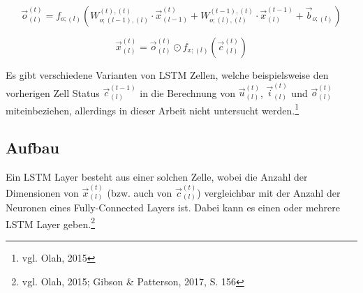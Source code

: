 \documentclass[a4paper,12pt,ngerman,oneside]{scrreprt}	%
\begin{document}
			\begin{equation}\label{oFormel}
				\vec{o}_{(l)}^{(t)} = f_{o;(l)} \left( W_{o; (l-1),(l)}^{(t),(t)} \cdot \vec{x}_{(l-1)}^{(t)} + W_{o; (l),(l)}^{(t-1),(t)} \cdot \vec{x}_{(l)}^{(t-1)} + \vec{b}_{o; (l)} \right)
			\end{equation}
			
			\begin{equation}\label{xFormel}
				\vec{x}_{(l)}^{(t)} = \vec{o}_{(l)}^{(t)} \odot f_{x; (l)}(\vec{c}_{(l)}^{(t)})
			\end{equation}
			
			Es gibt verschiedene Varianten von LSTM Zellen, welche beispielsweise den vorherigen Zell Status $\vec{c}_{(l)}^{(t-1)}$ in die Berechnung von $\vec{u}_{(l)}^{(t)}$, $\vec{i}_{(l)}^{(t)}$ und $\vec{o}_{(l)}^{(t)}$ miteinbeziehen, allerdings in dieser Arbeit nicht untersucht werden.\footnote{vgl. Olah, 2015}
			
			
			\subsection{Aufbau}
			Ein LSTM Layer besteht aus einer solchen Zelle, wobei die Anzahl der Dimensionen von $\vec{x}_{(l)}^{(t)}$ (bzw. auch von $\vec{c}_{(l)}^{(t)}$) vergleichbar mit der Anzahl der Neuronen eines Fully-Connected Layers ist. Dabei kann es einen oder mehrere LSTM Layer geben.\footnote{vgl. Olah, 2015; Gibson \& Patterson, 2017, S. 156}
	
	
\end{document}
